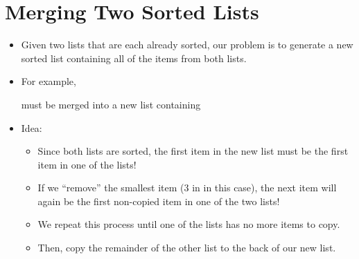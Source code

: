 \documentclass[letterpaper,10pt,english]{sphinxmanual}
\begin{document}
\section{Merging Two Sorted Lists}
\label{\detokenize{lecture_notes/lec21_sorting:merging-two-sorted-lists}}\begin{itemize}
\item {} 
Given two lists that are each already sorted, our problem is to
generate a new sorted list containing all of the items from both
lists.

\item {} 
For example,

%
\begin{sphinxVerbatim}[commandchars=\\\{\}]
  \PYG{p}{[}     \PYG{p}{]}
  \PYG{p}{[}      \PYG{p}{]}
\end{sphinxVerbatim}

must be merged into a new list containing

%
\begin{sphinxVerbatim}[commandchars=\\\{\}]
\PYG{p}{[}          \PYG{p}{]}
\end{sphinxVerbatim}

\item {} 
Idea:
\begin{itemize}
\item {} 
Since both lists are sorted, the first item in the new list must
be the first item in one of the lists!

\item {} 
If we “remove” the smallest item (3 in  in this case), the
next item will again be the first non-copied item in one of the
two lists!

\item {} 
We repeat this process until one of the lists has no more items to
copy.

\item {} 
Then, copy the remainder of the other list to the back of our new
list.


\end{itemize}
\end{itemize}
\end{document}
